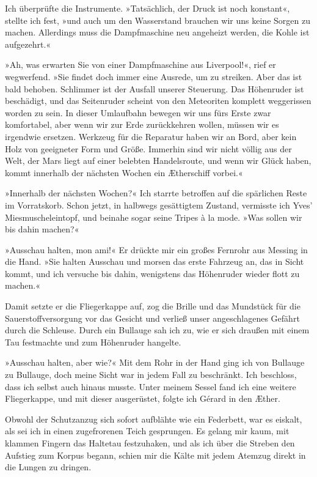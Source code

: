 Ich überprüfte die Instrumente. »Tatsächlich, der Druck ist noch
konstant«, stellte ich fest, »und auch um den Wasserstand brauchen
wir uns keine Sorgen zu machen. Allerdings muss die Dampfmaschine
neu angeheizt werden, die Kohle ist aufgezehrt.«

»Ah, was erwarten Sie von einer Dampfmaschine aus Liverpool!«, rief
er wegwerfend. »Sie findet doch immer eine Ausrede, um zu streiken.
Aber das ist bald behoben. Schlimmer ist der Ausfall unserer
Steuerung. Das Höhenruder ist beschädigt, und das Seitenruder
scheint von den Meteoriten komplett weggerissen worden zu sein. In
dieser Umlaufbahn bewegen wir uns fürs Erste zwar komfortabel, aber
wenn wir zur Erde zurückkehren wollen, müssen wir es irgendwie
ersetzen. Werkzeug für die Reparatur haben wir an Bord, aber kein
Holz von geeigneter Form und Größe. Immerhin sind wir nicht völlig
aus der Welt, der Mars liegt auf einer belebten Handelsroute, und
wenn wir Glück haben, kommt innerhalb der nächsten Wochen ein
Ætherschiff vorbei.«

»Innerhalb der nächsten Wochen?« Ich starrte betroffen auf die
spärlichen Reste im Vorratskorb. Schon jetzt, in halbwegs
gesättigtem Zustand, vermisste ich Yves’ Miesmuscheleintopf, und
beinahe sogar seine Tripes à la mode. »Was sollen wir bis dahin
machen?«

»Ausschau halten, mon ami!« Er drückte mir ein großes Fernrohr aus
Messing in die Hand. »Sie halten Ausschau und morsen das erste
Fahrzeug an, das in Sicht kommt, und ich versuche bis dahin,
wenigstens das Höhenruder wieder flott zu machen.«

Damit setzte er die Fliegerkappe auf, zog die Brille und das
Mundstück für die Sauerstoffversorgung vor das Gesicht und verließ
unser angeschlagenes Gefährt durch die Schleuse. Durch ein Bullauge
sah ich zu, wie er sich draußen mit einem Tau festmachte und zum
Höhenruder hangelte.

»Ausschau halten, aber wie?« Mit dem Rohr in der Hand ging ich von
Bullauge zu Bullauge, doch meine Sicht war in jedem Fall zu
beschränkt. Ich beschloss, dass ich selbst auch hinaus musste.
Unter meinem Sessel fand ich eine weitere Fliegerkappe, und mit
dieser ausgerüstet, folgte ich Gérard in den Æther.

Obwohl der Schutzanzug sich sofort aufblähte wie ein Federbett, war
es eiskalt, als sei ich in einen zugefrorenen Teich gesprungen. Es
gelang mir kaum, mit klammen Fingern das Haltetau festzuhaken, und
als ich über die Streben den Aufstieg zum Korpus begann, schien mir
die Kälte mit jedem Atemzug direkt in die Lungen zu dringen.


